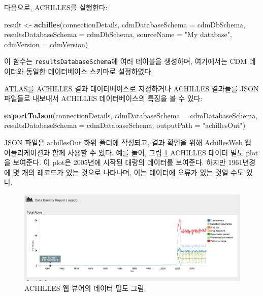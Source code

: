 \documentclass[11pt]{book}
\newenvironment{Shaded}{\begin{snugshade}}{\end{snugshade}}
\newcommand{\KeywordTok}[1]{\textcolor[rgb]{0.13,0.29,0.53}{\textbf{#1}}}
\newcommand{\DataTypeTok}[1]{\textcolor[rgb]{0.13,0.29,0.53}{#1}}
\newcommand{\StringTok}[1]{\textcolor[rgb]{0.31,0.60,0.02}{#1}}
\newcommand{\NormalTok}[1]{#1}
\theoremstyle{definition}
\theoremstyle{definition}
\theoremstyle{definition}
\theoremstyle{remark}
\begin{document}
다음으로, ACHILLES를 실행한다:

\begin{Shaded}
\begin{Highlighting}[]
\NormalTok{result <-}\StringTok{ }\KeywordTok{achilles}\NormalTok{(connectionDetails,}
                   \DataTypeTok{cdmDatabaseSchema =}\NormalTok{ cdmDbSchema,}
                   \DataTypeTok{resultsDatabaseSchema =}\NormalTok{ cdmDbSchema,}
                   \DataTypeTok{sourceName =} \StringTok{"My database"}\NormalTok{,}
                   \DataTypeTok{cdmVersion =}\NormalTok{ cdmVersion)}
\end{Highlighting}
\end{Shaded}

이 함수는 \texttt{resultsDatabaseSchema}에 여러 테이블을 생성하며,
여기에서는 CDM 데이터와 동일한 데이터베이스 스키마로 설정하였다.

ATLAS를 ACHILLES 결과 데이터베이스로 지정하거나 ACHILLES 결과들를 JSON
파일들로 내보내서 ACHILLES 데이터베이스의 특징을 볼 수 있다:

\begin{Shaded}
\begin{Highlighting}[]
\KeywordTok{exportToJson}\NormalTok{(connectionDetails,}
             \DataTypeTok{cdmDatabaseSchema =}\NormalTok{ cdmDatabaseSchema,}
             \DataTypeTok{resultsDatabaseSchema =}\NormalTok{ cdmDatabaseSchema,}
             \DataTypeTok{outputPath =} \StringTok{"achillesOut"}\NormalTok{)}
\end{Highlighting}
\end{Shaded}

JSON 파일은 achillesOut 하위 폴더에 작성되고, 결과 확인을 위해
AchillesWeb 웹 어플리케이션과 함께 사용할 수 있다. 예를 들어, 그림
\ref{fig:achillesDataDensity} ACHILLES 데이터 밀도 plot을 보여준다. 이
plot은 2005년에 시작된 대량의 데이터를 보여준다. 하지만 1961년경에 몇
개의 레코드가 있는 것으로 나타나며, 이는 데이터에 오류가 있는 것일 수도
있다.

\begin{figure}

{\centering \includegraphics[width=1\linewidth]{images/DataQuality/achillesDataDensity} 

}

\caption{ACHILLES 웹 뷰어의 데이터 밀도 그림.}\label{fig:achillesDataDensity}
\end{figure}
\end{document}
